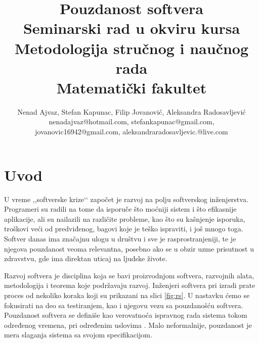 \documentclass[a4paper]{article}
\begin{document}
\title{Pouzdanost softvera\\ \small{Seminarski rad u okviru kursa\\Metodologija stručnog i naučnog rada\\ Matematički fakultet}}

\author{Nenad Ajvaz, Stefan Kapunac, Filip Jovanović, Aleksandra Radosavljević\\ nenadajvaz@hotmail.com, stefankapunac@gmail.com, \\jovanovic16942@gmail.com, aleksandraradosavljevic.@live.com}


\maketitle


\tableofcontents

\newpage

\section{Uvod}
\label{sec:uvod}

U vreme ,,softverske krize‘‘ započet je razvoj na polju softverskog inženjerstva.
Programeri su radili na tome da isporuče što moćniji sistem i što efikasnije aplikacije, ali su nailazili na različite probleme, kao što su kašnjenje isporuka, troškovi veći od predviđenog, bagovi koje je teško ispraviti, i još mnogo toga.
Softver danas ima značajnu ulogu u društvu i sve je rasprostranjeniji, te je njegova pouzdanost veoma relevantna, posebno ako se u obzir uzme prisutnost u zdravstvu, gde ima direktan uticaj na ljudske živote.

Razvoj softvera je disciplina koja se bavi proizvodnjom softvera, razvojnih alata, metodologija i teorema koje podržavaju razvoj.
Inženjeri softvera pri izradi prate proces od nekoliko koraka koji su prikazani na slici \ref{fig:rs}.
U nastavku ćemo se fokusirati na deo sa testiranjem, kao i njegovu vezu sa pouzdanošću softvera.
Pouzdanost softvera se definiše kao verovatnoća ispravnog rada sistema tokom određenog vremena, pri određenim uslovima \cite{pham_reliability}.
Malo neformalnije, pouzdanost je mera slaganja sistema sa svojom specifikacijom.
\end{document}
